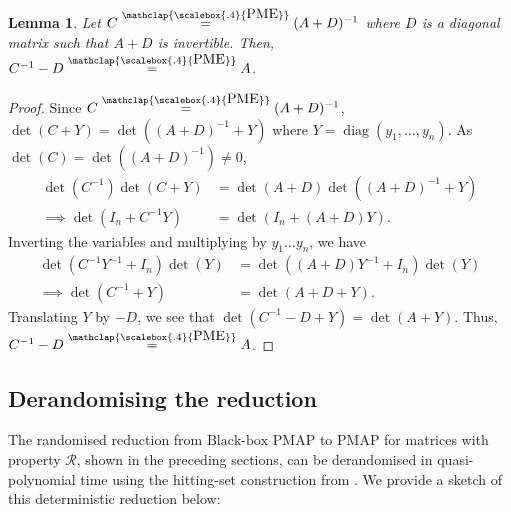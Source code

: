 \documentclass[11pt,letterpaper]{article}
\DeclareMathOperator*{\diag}{diag}
\newtheorem{lemma}{Lemma}[section]
\newcommand{\PME}{\stackrel{\mathclap{\scalebox{.4}{\mbox{PME}}}}{=}}
\newcommand{\prop}{\mathcal{R}}
\newcommand{\probB}{\text{Black-box PMAP}}
\begin{document}
{{{\begin{lemma}\label{lem:pme_A_from_pme_adj_A}
    Let $C \PME (A+D)^{-1}$ where $D$ is a diagonal matrix such that $A+D$ is invertible. Then, $C^{-1} - D \PME A$.
\end{lemma}

\begin{proof}
Since $C \PME (A+D)^{-1}$, $\det(C + Y) = \det((A+D)^{-1} + Y)$ where $Y = \diag(y_1,\dots,y_n)$. As $\det(C) = \det((A+D)^{-1}) \neq 0$, 
\begin{align*}
    \det(C^{-1}) \det(C + Y) &= \det(A+D) \det((A+D)^{-1} + Y) \\
    \implies \det(I_n + C^{-1} Y)&= \det(I_n + (A+D)Y)\text{.}
\end{align*}
Inverting the variables and multiplying by $y_1\dots y_n$, we have
\begin{align*}
    \det(C^{-1} Y^{-1} + I_n)\det(Y) &= \det((A+D)Y^{-1} + I_n)\det(Y) \\
    \implies \det(C^{-1} + Y) &= \det(A+D + Y)\text{.}
\end{align*}
Translating $Y$ by $-D$, we see that $\det(C^{-1} - D + Y) = \det(A + Y)$. Thus, $C^{-1} - D \PME A$.
\end{proof}

\subsection{Derandomising the reduction}\label{sec:deranomisation}

The randomised reduction from $\probB$ to PMAP for matrices with property $\prop$, shown in the preceding sections, can be derandomised in quasi-polynomial time using the hitting-set construction from \cite{GT20}. We provide a sketch of this deterministic reduction below:  

}}}
\end{document}
